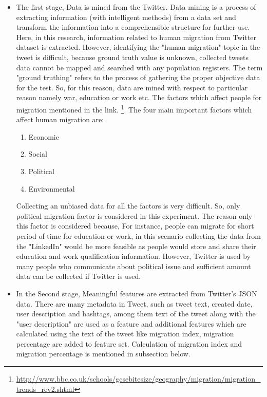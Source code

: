 \begin{itemize}
  \item  The first stage, Data is mined from the Twitter. Data mining is a process of extracting information (with intelligent methods) from a data set and transform the information into a comprehensible structure for further use. Here, in this research, information related to human migration from Twitter dataset is extracted. However, identifying the "human migration" topic in the tweet is difficult, because ground truth value is unknown, collected tweets data cannot be mapped and searched with any population registers. The term "ground truthing" refers to the process of gathering the proper objective data for the test. So, for this reason, data are mined with respect to particular reason namely war, education or work etc. The factors which affect people for migration mentioned in the link.  \footnote{\url{http://www.bbc.co.uk/schools/gcsebitesize/geography/migration/migration_trends_rev2.shtml}  }. The four main important factors which affect human migration are:


\begin{enumerate}
    \item Economic
  \item Social
    \item Political
  \item Environmental
\end{enumerate}
Collecting an unbiased data for all the factors is very difficult. So, only political migration factor is considered in this experiment. The reason only this factor is considered because,  For instance, people can migrate for short period of time for education or work, in this scenario collecting the data from the "LinkedIn" would be more feasible as people would store and share their education and work qualification information. However, Twitter is used by many people who communicate about political issue and sufficient amount data can be collected if Twitter is used.
  
  \item In the Second stage, Meaningful features are extracted from Twitter's JSON data. There are many metadata in Tweet, such as tweet text, created date, user description and hashtags, among them text of the tweet along with the "user description" are used as a feature and additional features which are calculated using the text of the tweet like migration index, migration percentage are added to feature set. Calculation of migration index and migration percentage is mentioned in subsection below.
  

\end{itemize}
